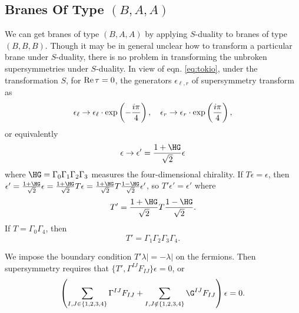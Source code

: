 
\subsection{Branes Of Type $(B,A,A)$}

We can get branes of type $(B,A,A)$ by applying $S$-duality to
branes of type $(B,B,B)$.  Though it may be in general unclear how
to transform a particular brane under $S$-duality, there is no
problem in transforming the unbroken supersymmetries under
$S$-duality.  In view of eqn. \eqref{eq:tokio}, under the transformation
$S$, for ${\rm Re}\,\tau=0$, the generators $\epsilon_{\ell,r}$ of
supersymmetry transform as %
\setcounter{equation}{19}
\begin{equation}\label{eq:bilj}
\epsilon_\ell\to
\epsilon_\ell\cdot\exp\left(-{i\pi\over 4}\right),\quad
\epsilon_r\to \epsilon_r\cdot\exp\left({i\pi\over 4}\right),
\end{equation}
 or
equivalently %
\setcounter{equation}{20}
\begin{equation}\label{eq:yogo}
\epsilon\to\epsilon'={1+\HG\over \sqrt
2}\epsilon
\end{equation}
 where $\HG=\Gamma_0\Gamma_1\Gamma_2\Gamma_3$ measures
the four-dimensional chirality.  If $T\epsilon=\epsilon$, then
$\epsilon'={1+\HG\over \sqrt 2}\epsilon={1+\HG\over \sqrt
2}T\epsilon={1+\HG\over \sqrt 2}T{1-\HG\over \sqrt 2}\epsilon'$,
so $T'\epsilon'=\epsilon'$ where %
\setcounter{equation}{21}
\begin{equation}\label{eq:uvuf}
T'={1+\HG\over \sqrt
2}T{1-\HG\over \sqrt 2}.
\end{equation}
 If $T=\Gamma_0\Gamma_4$, then
\setcounter{equation}{22}
\begin{equation}\label{eq:polyo}
T'=\Gamma_1\Gamma_2\Gamma_3\Gamma_4.
\end{equation}

We impose the boundary condition $T'\lambda|=-\lambda|$ on the
fermions. Then supersymmetry requires that
$\{T',\Gamma^{IJ}F_{IJ}\}\epsilon=0$, or
\setcounter{equation}{23}
\begin{equation}\label{eq:bngo}
\left(\sum_{I,J\in
\{1,2,3,4\}}\Gamma^{IJ}F_{IJ}+\sum_{I,J\notin
\{1,2,3,4\}}\G^{IJ}F_{IJ}\right)\epsilon=0.
\end{equation}

